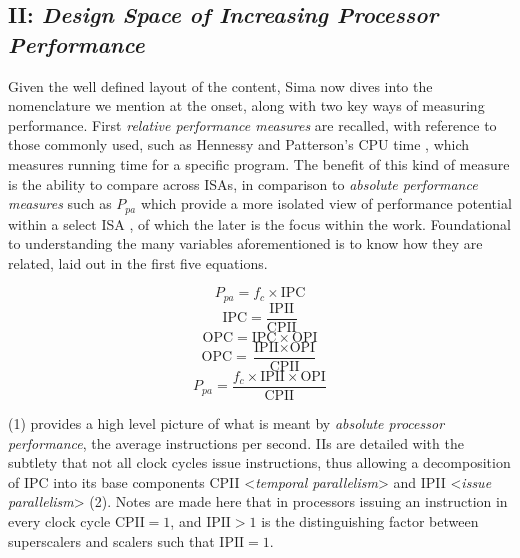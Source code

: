 \documentclass{article}
\begin{document}
\subsection{\textbf{II}: \emph{Design Space of Increasing Processor Performance}}
Given the well defined layout of the content, Sima now dives into the nomenclature we mention at the onset, along with two key ways of measuring performance. 
First \emph{relative performance measures} are recalled, with reference to those commonly used, such as Hennessy and Patterson's CPU time \cite{Hennessy}, which measures running time for a specific program.  
The benefit of this kind of measure is the ability to compare across ISAs, in comparison to \emph{absolute performance measures} such as \(P_{pa}\) which provide a more isolated view of performance potential within a select ISA \cite{Sima}, of which the later is the focus within the work. 
Foundational to understanding the many variables aforementioned is to know how they are related, laid out in the first five equations. 
\begin{multicols}{2}
\begin{equation}
    P_{pa} = f_{c} \times \text{IPC}
\end{equation}
\begin{equation}
    \text{IPC} = \frac{\text{IPII}}{\text{CPII}}
\end{equation}
\begin{equation}
    \text{OPC} = \text{IPC} \times \text{OPI}
\end{equation}
\begin{equation}
    \text{OPC} = \frac{\text{IPII} \times \text{OPI}}{\text{CPII}}
\end{equation}
\begin{equation}
    P_{pa} = \frac{f_{c} \times \text{IPII} \times \text{OPI}}{\text{CPII}}
\end{equation}
\end{multicols}

(1) provides a high level picture of what is meant by \emph{absolute processor performance}, the average instructions per second. 
IIs are detailed with the subtlety that not all clock cycles issue instructions, thus allowing a decomposition of IPC into its base components CPII <\emph{temporal parallelism}> and IPII <\emph{issue parallelism}> (2). 
Notes are made here that in processors issuing an instruction in every clock cycle $\text{CPII} = 1$, and $\text{IPII} > 1$ is the distinguishing factor between superscalers and scalers such that $\text{IPII} = 1$.
\end{document}

